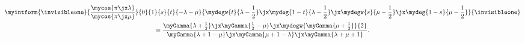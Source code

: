   \begin{multline}
      \myintform{\invisibleone}{\frac{\mycos{\pi\jx\lambda}}{\mycos{\pi\jx\mu}}}
      {0}{1}{s}{t}{-\lambda-\mu}
      {\mydegw{t}{\lambda-\frac{1}{2}}\jx
        \mydeg{1-t}{\lambda-\frac{1}{2}}\jx
      \mydegw{s}{\mu-\frac{1}{2}}\jx
        \mydeg{1-s}{\mu-\frac{1}{2}}}
      {\invisibleone}
    \\
    \displaystyle=
    \frac{\myGamma{\lambda + \frac{1}{2}}\jx
    \myGamma{\frac{1}{2}-\mu}\jx\mydegw{\myGamma{\mu+\frac{1}{2}}}{2}}
    {\myGamma{\lambda+1-\mu}\jx\myGamma{\mu+1-\lambda}\jx\myGamma{\lambda+\mu+1}}
      .\label{eqn:spec_warnaar}
  \end{multline}
